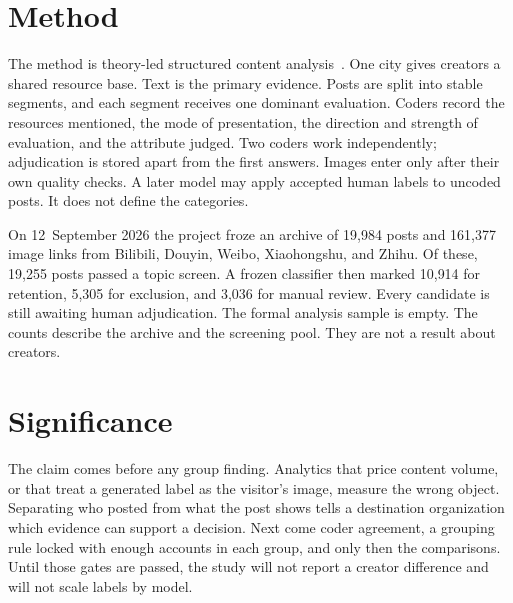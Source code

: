\documentclass[runningheads]{llncs}
\begin{document}
\section{Method}
The method is theory-led structured content analysis~\cite{krippendorff2018,neuendorf2017}. One city gives creators a shared resource base. Text is the primary evidence. Posts are split into stable segments, and each segment receives one dominant evaluation. Coders record the resources mentioned, the mode of presentation, the direction and strength of evaluation, and the attribute judged. Two coders work independently; adjudication is stored apart from the first answers. Images enter only after their own quality checks. A later model may apply accepted human labels to uncoded posts. It does not define the categories.

On 12~September 2026 the project froze an archive of 19{,}984 posts and 161{,}377 image links from Bilibili, Douyin, Weibo, Xiaohongshu, and Zhihu. Of these, 19{,}255 posts passed a topic screen. A frozen classifier then marked 10{,}914 for retention, 5{,}305 for exclusion, and 3{,}036 for manual review. Every candidate is still awaiting human adjudication. The formal analysis sample is empty. The counts describe the archive and the screening pool. They are not a result about creators.

\section{Significance}
The claim comes before any group finding. Analytics that price content volume, or that treat a generated label as the visitor's image, measure the wrong object. Separating who posted from what the post shows tells a destination organization which evidence can support a decision. Next come coder agreement, a grouping rule locked with enough accounts in each group, and only then the comparisons. Until those gates are passed, the study will not report a creator difference and will not scale labels by model.
\end{document}
